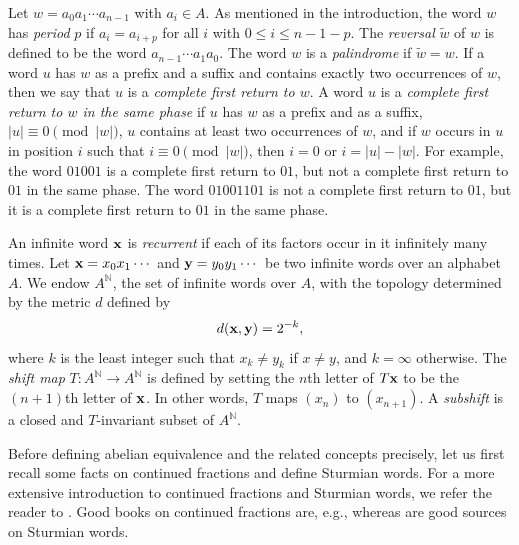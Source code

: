 \documentclass[a4paper,fleqn]{article}
\providecommand{\abs}[1]{\lvert#1\rvert}
\newcommand{\infw}[1]{%
  \ifcat\noexpand#1\relax\bm{#1}%
  \else\mathbf{#1}\fi}          %
\newcommand{\mirror}[1]{\widetilde{#1}}
\newcommand{\N}{\mathbb{N}}
\begin{document}
  Let $w = a_0 a_1 \dotsm a_{n-1}$ with $a_i \in A$. As mentioned in the introduction, the word $w$ has \emph{period}
  $p$ if $a_i = a_{i+p}$ for all $i$ with $0 \leq i \leq n - 1 - p$. The \emph{reversal} $\mirror{w}$ of $w$ is defined
  to be the word $a_{n-1} \dotsm a_1 a_0$. The word $w$ is a \emph{palindrome} if $\mirror{w} = w$. If a word $u$ has
  $w$ as a prefix and a suffix and contains exactly two occurrences of $w$, then we say that $u$ is a \emph{complete
  first return to $w$}. A word $u$ is a \emph{complete first return to $w$ in the same phase} if $u$ has $w$ as a
  prefix and as a suffix, $\abs{u} \equiv 0 \pmod{\abs{w}}$, $u$ contains at least two occurrences of $w$, and if $w$
  occurs in $u$ in position $i$ such that $i \equiv 0 \pmod{\abs{w}}$, then $i = 0$ or $i = \abs{u} - \abs{w}$. For
  example, the word $01001$ is a complete first return to $01$, but not a complete first return to $01$ in the same
  phase. The word $01001101$ is not a complete first return to $01$, but it is a complete first return to $01$ in the
  same phase.

  An infinite word $\infw{x}$ is \emph{recurrent} if each of its factors occur in it infinitely many times. Let
  $\infw{x} = x_0 x_1 \dotsm$ and $\infw{y} = y_0 y_1 \dotsm$ be two infinite words over an alphabet $A$. We endow
  $A^\N$, the set of infinite words over $A$, with the topology determined by the metric $d$ defined by
  \begin{equation*}
    d(\infw{x}, \infw{y}) = 2^{-k},
  \end{equation*}
  where $k$ is the least integer such that $x_k \neq y_k$ if $x \neq y$, and $k = \infty$ otherwise. The \emph{shift
  map} $T\colon A^\N \to A^\N$ is defined by setting the $n$th letter of $T\infw{x}$ to be the $(n+1)$th letter of
  $\infw{x}$. In other words, $T$ maps $(x_n)$ to $(x_{n+1})$. A \emph{subshift} is a closed and $T$-invariant subset
  of $A^\N$.
  
  Before defining abelian equivalence and the related concepts precisely, let us first recall some facts on continued
  fractions and define Sturmian words. For a more extensive introduction to continued fractions and Sturmian words, we
  refer the reader to \cite[Ch.~4]{diss:jarkko_peltomaki}. Good books on continued fractions are, e.g.,
  \cite{1979:an_introduction_to_the_theory_of_numbers,1997:continued_fractions} whereas
  \cite{2002:algebraic_combinatorics_on_words,2002:substitutions_in_dynamics_arithmetics_and_combinatorics} are good
  sources on Sturmian words.
\end{document}
